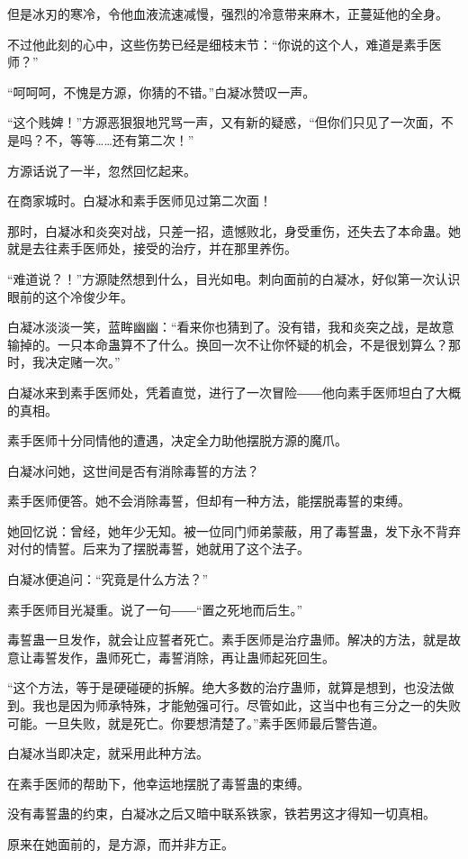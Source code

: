\begin{this_body}
但是冰刃的寒冷，令他血液流速减慢，强烈的冷意带来麻木，正蔓延他的全身。

不过他此刻的心中，这些伤势已经是细枝末节：“你说的这个人，难道是素手医师？”

“呵呵呵，不愧是方源，你猜的不错。”白凝冰赞叹一声。

“这个贱婢！”方源恶狠狠地咒骂一声，又有新的疑惑，“但你们只见了一次面，不是吗？不，等等……还有第二次！”

方源话说了一半，忽然回忆起来。

在商家城时。白凝冰和素手医师见过第二次面！

那时，白凝冰和炎突对战，只差一招，遗憾败北，身受重伤，还失去了本命蛊。她就是去往素手医师处，接受的治疗，并在那里养伤。

“难道说？！”方源陡然想到什么，目光如电。刺向面前的白凝冰，好似第一次认识眼前的这个冷俊少年。

白凝冰淡淡一笑，蓝眸幽幽：“看来你也猜到了。没有错，我和炎突之战，是故意输掉的。一只本命蛊算不了什么。换回一次不让你怀疑的机会，不是很划算么？那时，我决定赌一次。”

白凝冰来到素手医师处，凭着直觉，进行了一次冒险――他向素手医师坦白了大概的真相。

素手医师十分同情他的遭遇，决定全力助他摆脱方源的魔爪。

白凝冰问她，这世间是否有消除毒誓的方法？

素手医师便答。她不会消除毒誓，但却有一种方法，能摆脱毒誓的束缚。

她回忆说：曾经，她年少无知。被一位同门师弟蒙蔽，用了毒誓蛊，发下永不背弃对付的情誓。后来为了摆脱毒誓，她就用了这个法子。

白凝冰便追问：“究竟是什么方法？”

素手医师目光凝重。说了一句――“置之死地而后生。”

毒誓蛊一旦发作，就会让应誓者死亡。素手医师是治疗蛊师。解决的方法，就是故意让毒誓发作，蛊师死亡，毒誓消除，再让蛊师起死回生。

“这个方法，等于是硬碰硬的拆解。绝大多数的治疗蛊师，就算是想到，也没法做到。我也是因为师承特殊，才能勉强可行。尽管如此，这当中也有三分之一的失败可能。一旦失败，就是死亡。你要想清楚了。”素手医师最后警告道。

白凝冰当即决定，就采用此种方法。

在素手医师的帮助下，他幸运地摆脱了毒誓蛊的束缚。

没有毒誓蛊的约束，白凝冰之后又暗中联系铁家，铁若男这才得知一切真相。

原来在她面前的，是方源，而并非方正。


\end{this_body}
